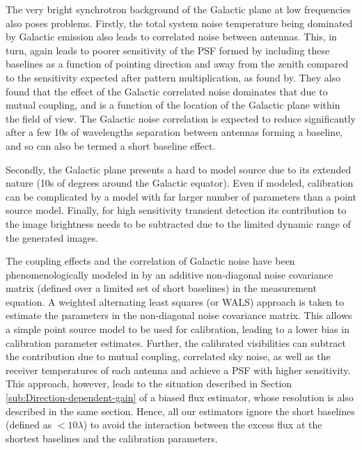 \documentclass{aa}
\begin{document}
The very bright synchrotron background  of the Galactic plane at low frequencies
also poses problems. Firstly, the total system noise temperature being dominated
by Galactic emission  also leads to correlated noise  between antennas. This, in
turn, again  leads to poorer  sensitivity of the  PSF formed by  including these
baselines as a function of pointing  direction and away from the zenith compared
to   the   sensitivity  expected   after   pattern   multiplication,  as   found
by\citep{ellingson2011sensitivity}.   They also  found  that the  effect of  the
Galactic  correlated noise  dominates  that due  to  mutual coupling,  and is  a
function of  the location of  the Galactic plane  within the field of  view. The
Galactic noise correlation  is expected to reduce significantly  after a few 10s
of wavelengths separation  between antennas forming a baseline,  and so can also
be termed a short baseline effect.

Secondly, the Galactic plane presents a hard to model source due to its extended
nature  (10s  of  degrees  around  the  Galactic  equator).   Even  if  modeled,
calibration can be  complicated by a model with far  larger number of parameters
than a point source model. Finally, for high sensitivity transient detection its
contribution to the  image brightness needs to be subtracted  due to the limited
dynamic range of the generated images.

The  coupling  effects   and  the  correlation  of  Galactic   noise  have  been
phenomenologically   modeled  in   \citep{wijnholds2010self}   by  an   additive
non-diagonal  noise covariance  matrix  (defined  over a  limited  set of  short
baselines) in the measurement equation. A weighted alternating least squares (or
WALS) approach  is taken  to estimate the  parameters in the  non-diagonal noise
covariance  matrix. This  allows a  simple  point source  model to  be used  for
calibration,   leading    to   a    lower   bias   in    calibration   parameter
estimates. Further,  the calibrated  visibilities can subtract  the contribution
due  to  mutual  coupling,  correlated  sky  noise,  as  well  as  the  receiver
temperatures of  each antenna  and achieve a  PSF with higher  sensitivity. This
approach,   however,    leads   to   the   situation    described   in   Section
\ref{sub:Direction-dependent-gain} of a  biased flux estimator, whose resolution
is also  described in the  same section.  Hence,  all our estimators  ignore the
short baselines (defined  as $<10\lambda$) to avoid the  interaction between the
excess flux at the shortest baselines and the calibration parameters.
\end{document}
